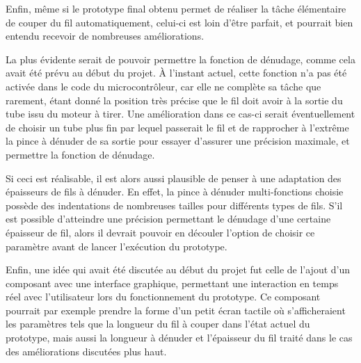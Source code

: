 \par Enfin, même si le prototype final obtenu permet de réaliser la tâche élémentaire de couper du fil automatiquement, celui-ci est loin d'être parfait, et pourrait bien entendu recevoir de nombreuses améliorations.
\par La plus évidente serait de pouvoir permettre la fonction de dénudage, comme cela avait été prévu au début du projet. À l'instant actuel, cette fonction n'a pas été activée dans le code du microcontrôleur, car elle ne complète sa tâche que rarement, étant donné la position très précise que le fil doit avoir à la sortie du tube issu du moteur à tirer. Une amélioration dans ce cas-ci serait éventuellement de choisir un tube plus fin par lequel passerait le fil et de rapprocher à l'extrême la pince à dénuder de sa sortie pour essayer d'assurer une précision maximale, et permettre la fonction de dénudage.
\par Si ceci est réalisable, il est alors aussi plausible de penser à une adaptation des épaisseurs de fils à dénuder. En effet, la pince à dénuder multi-fonctions choisie possède des indentations de nombreuses tailles pour différents types de fils. S'il est possible d'atteindre une précision permettant le dénudage d'une certaine épaisseur de fil, alors il devrait pouvoir en découler l'option de choisir ce paramètre avant de lancer l'exécution du prototype.
\par Enfin, une idée qui avait été discutée au début du projet fut celle de l'ajout d'un composant avec une interface graphique, permettant une interaction en temps réel avec l'utilisateur lors du fonctionnement du prototype. Ce composant pourrait par exemple prendre la forme d'un petit écran tactile où s'afficheraient les paramètres tels que la longueur du fil à couper dans l'état actuel du prototype, mais aussi la longueur à dénuder et l'épaisseur du fil traité dans le cas des améliorations discutées plus haut.